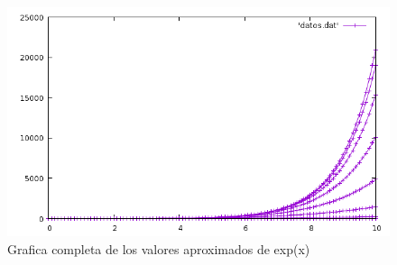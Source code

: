 \documentclass{article}
\begin{document}
\begin{figure}
  \includegraphics[width=\linewidth]{Full.png}
  \caption{Grafica completa de los valores aproximados de exp(x)}
\end{figure}
\end{document}
